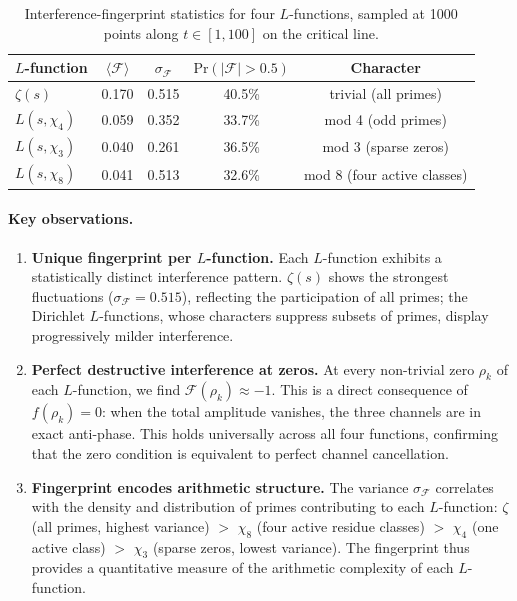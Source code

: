 \documentclass[aps,prx,reprint,floatfix]{revtex4-2}
\begin{document}
\begin{table}[htbp]
\centering
\caption{Interference-fingerprint statistics for four $L$-functions,
sampled at 1000 points along $t\in[1,100]$ on the critical line.}
\label{tab:fingerprints}
\begin{tabular}{lcccc}
\toprule
$L$-function & $\langle\mathcal{F}\rangle$ & $\sigma_\mathcal{F}$
  & $\mathrm{Pr}(|\mathcal{F}|>0.5)$ & Character \\
\midrule
$\zeta(s)$         & 0.170 & 0.515 & 40.5\% & trivial (all primes) \\
$L(s,\chi_4)$      & 0.059 & 0.352 & 33.7\% & mod 4 (odd primes) \\
$L(s,\chi_3)$      & 0.040 & 0.261 & 36.5\% & mod 3 (sparse zeros) \\
$L(s,\chi_8)$      & 0.041 & 0.513 & 32.6\% & mod 8 (four active classes) \\
\bottomrule
\end{tabular}
\end{table}

\paragraph{Key observations.}
\begin{enumerate}[leftmargin=1.4em]
\item \textbf{Unique fingerprint per $L$-function.}  Each $L$-function
exhibits a statistically distinct interference pattern.  $\zeta(s)$ shows
the strongest fluctuations ($\sigma_\mathcal{F}=0.515$), reflecting the
participation of all primes; the Dirichlet $L$-functions, whose characters
suppress subsets of primes, display progressively milder interference.

\item \textbf{Perfect destructive interference at zeros.}  At every
non-trivial zero $\rho_k$ of each $L$-function, we find
$\mathcal{F}(\rho_k)\approx -1$.  This is a direct consequence of
$f(\rho_k)=0$: when the total amplitude vanishes, the three channels are
in exact anti-phase.  This holds universally across all four functions,
confirming that the zero condition is equivalent to perfect channel
cancellation.

\item \textbf{Fingerprint encodes arithmetic structure.}  The variance
$\sigma_\mathcal{F}$ correlates with the density and distribution of primes
contributing to each $L$-function: $\zeta$ (all primes, highest variance)
$>$ $\chi_8$ (four active residue classes) $>$ $\chi_4$ (one active class)
$>$ $\chi_3$ (sparse zeros, lowest variance).  The fingerprint thus
provides a quantitative measure of the arithmetic complexity of each
$L$-function.
\end{enumerate}
\end{document}
